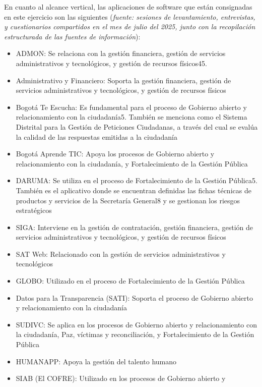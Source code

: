 \documentclass[
	a4paper, %
	12pt, %
]{include/CSSullivanBusinessReport}
\def\tightlist{}
\begin{document}
En cuanto al alcance vertical, las aplicaciones de software que están
consignadas en este ejercicio son las siguientes (\emph{fuente: sesiones
de levantamiento, entrevistas, y cuestionarios compartidos en el mes de
julio del 2025, junto con la recopilación estructurada de las fuentes de
información}):

\begin{itemize}
\tightlist
\item
  ADMON: Se relaciona con la gestión financiera, gestión de servicios
  administrativos y tecnológicos, y gestión de recursos físicos45.
\item
  Administrativo y Financiero: Soporta la gestión financiera, gestión de
  servicios administrativos y tecnológicos, y gestión de recursos
  físicos
\item
  Bogotá Te Escucha: Es fundamental para el proceso de Gobierno abierto
  y relacionamiento con la ciudadanía5. También se menciona como el
  Sistema Distrital para la Gestión de Peticiones Ciudadanas, a través
  del cual se evalúa la calidad de las respuestas emitidas a la
  ciudadanía
\item
  Bogotá Aprende TIC: Apoya los procesos de Gobierno abierto y
  relacionamiento con la ciudadanía, y Fortalecimiento de la Gestión
  Pública
\item
  DARUMA: Se utiliza en el proceso de Fortalecimiento de la Gestión
  Pública5. También es el aplicativo donde se encuentran definidas las
  fichas técnicas de productos y servicios de la Secretaría General8 y
  se gestionan los riesgos estratégicos
\item
  SIGA: Interviene en la gestión de contratación, gestión financiera,
  gestión de servicios administrativos y tecnológicos, y gestión de
  recursos físicos
\item
  SAT Web: Relacionado con la gestión de servicios administrativos y
  tecnológicos
\item
  GLOBO: Utilizado en el proceso de Fortalecimiento de la Gestión
  Pública
\item
  Datos para la Transparencia (SATI): Soporta el proceso de Gobierno
  abierto y relacionamiento con la ciudadanía
\item
  SUDIVC: Se aplica en los procesos de Gobierno abierto y
  relacionamiento con la ciudadanía, Paz, víctimas y reconciliación, y
  Fortalecimiento de la Gestión Pública
\item
  HUMANAPP: Apoya la gestión del talento humano
\item
  SIAB (El COFRE): Utilizado en los procesos de Gobierno abierto y

\end{itemize}
\end{document}
